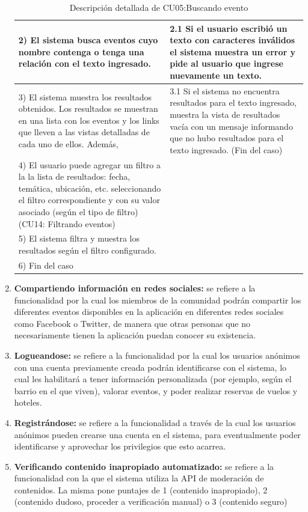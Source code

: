 \begin{enumerate}
\begin{table}[H]
\begin{tabularx}{\textwidth}{|X|X|}
    2) El sistema busca eventos cuyo nombre contenga o tenga una relación con el texto ingresado. & 2.1 Si el usuario escribió un texto con caracteres inválidos el sistema muestra un error y pide al usuario que ingrese nuevamente un texto. \\ \hline
    3) El sistema muestra los resultados obtenidos. Los resultados se muestran en una  lista con los eventos y los links que lleven a las vistas detalladas de cada uno de ellos. Además, & 3.1 Si el sistema no encuentra resultados para el texto ingresado, muestra la vista de resultados vacía con un mensaje informando que no hubo resultados para el texto ingresado. (Fin del caso) \\ \hline
    4) El usuario puede agregar un filtro a la la lista de resultados: fecha, temática, ubicación, etc.  seleccionando el filtro correspondiente y con su valor asociado (según el tipo de filtro) (CU14: Filtrando eventos) & \\ \hline
    5) El sistema filtra y muestra los resultados según el filtro configurado. &  \\ \hline
    6) Fin del caso & \\
    \hline
  \end{tabularx}
  \caption{Descripción detallada de CU05:Buscando evento}
  \label{tab:cu05}
  \end{table}
  \item \textbf{Compartiendo información en redes sociales:} se refiere a la funcionalidad por la cual los miembros de la comunidad podrán compartir los diferentes eventos disponibles en la aplicación en diferentes redes sociales como Facebook o Twitter, de manera que otras personas que no necesariamente tienen la aplicación puedan conocer su existencia.
  \item \textbf{Logueandose:} se refiere a la funcionalidad por la cual los usuarios anónimos con una cuenta previamente creada podrán identificarse con el sistema, lo cual les habilitará a tener información personalizada (por ejemplo, según el barrio en el que viven), valorar eventos, y poder realizar reservas de vuelos y hoteles.
  \item \textbf{Registrándose:} se refiere a la funcionalidad a través de la cual los usuarios anónimos pueden crearse una cuenta en el sistema, para eventualmente poder identificarse y aprovechar los privilegios que esto acarrea.
  \item \textbf{Verificando contenido inapropiado automatizado:} se refiere a la funcionalidad con la que el sistema utiliza la API de moderación de contenidos. La misma pone puntajes de 1 (contenido inapropiado), 2 (contenido dudoso, proceder a verificación manual) o 3 (contenido seguro)

\end{enumerate}
